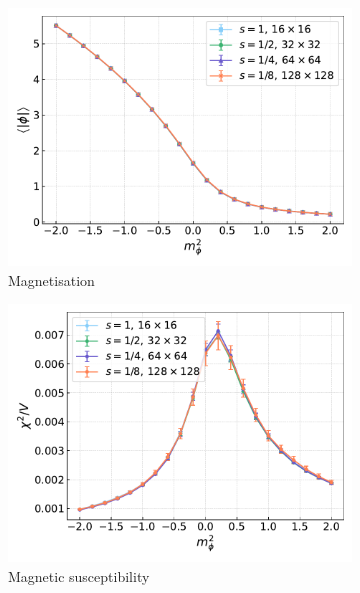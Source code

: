 \begin{figure}[hbp]
    \centering
    \begin{subfigure}[b]{0.49\textwidth}
        \includegraphics[width=\textwidth]{figures/cooling/mass_scan/magnetisation.pdf}
        \caption{Magnetisation}
    \end{subfigure}
    \hfill
    \begin{subfigure}[b]{0.49\textwidth}
        \includegraphics[width=\textwidth]{figures/cooling/mass_scan/susceptibility.pdf}
        \caption{Magnetic susceptibility}
    \end{subfigure}
    \begin{subfigure}[b]{0.49\textwidth}

\end{subfigure}
\end{figure}
